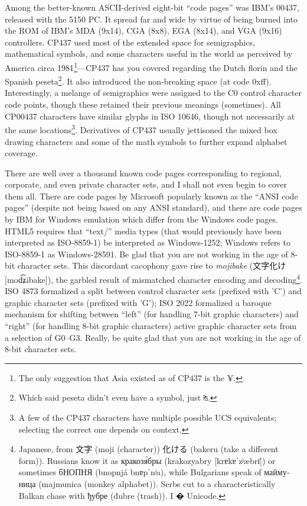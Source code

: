 Among the better-known ASCII-derived eight-bit ``code pages'' was IBM's 00437, released
with the 5150 PC. It spread far and wide by virtue of being burned into the
ROM of IBM's MDA (9x14), CGA (8x8), EGA (8x14), and VGA (9x16) controllers.
CP437 used most of the extended space for semigraphics, mathematical symbols,
and some characters useful in the world as perceived by America circa 1981\footnote{The
 only suggestion that Asia existed as of CP437 is the ¥.}---CP437 has you
covered regarding the Dutch florin and the Spanish peseta\footnote{Which said
peseta didn't even have a symbol, just \texttt{₧}.}. It also introduced
the non-breaking space (at code 0xff). Interestingly, a melange of semigraphics
were assigned to the C0 control character code points, though these retained
their previous meanings (sometimes). All CP00437 characters have similar
glyphs in ISO 10646, though not necessarily at the same locations\footnote{A few
of the CP437 characters have multiple possible UCS equivalents;
selecting the correct one depends on context.}. Derivatives of CP437
usually jettisoned the mixed box drawing characters and some of the math
symbols to further expand alphabet coverage.

There are well over a thousand known code pages corresponding to regional,
corporate, and even private character sets, and I shall not even begin to
cover them all. There are code pages by Microsoft popularly known as the ``ANSI
code pages'' (despite not being based on any ANSI standard), and there are code
pages by IBM for Windows emulation which differ from the Windows code pages.
HTML5 requires that ``text/'' media types (that would previously have been interpreted
as ISO-8859-1) be interpreted as Windows-1252; Windows refers to
ISO-8859-1 as Windows-28591. Be glad that you are not working in the age of
8-bit character sets. This discordant cacophony gave rise to \textit{mojibake}
(文字化け [{mod͡ʑibake}]), the garbled result of
mismatched character encoding and decoding\footnote{Japanese, from 文字 (moji
(character)) 化ける (bakeru (take a different form)). Russians know it as
\textrussian{кракозя́бры} (krakozyabry [{krɐkɐˈzʲæbrɪ̈}]) or sometimes \textrussian{бНОПНЯ} (bnopnjá
{bnɐpˈnʲa}), while Bulgarians speak of
\textbulgarian{маймуница} (majmunica (monkey alphabet)). Serbs cut to a
characteristically Balkan chase with \textrussian{ђубре} (đubre (trash)). I
{�} Unicode.}. ISO 4873\cite{iso4873} formalized a
split between control character sets (prefixed with 'C') and graphic character
sets (prefixed with 'G'); ISO 2022 formalized a baroque mechanism for shifting
between ``left'' (for handling 7-bit graphic characters) and ``right''
(for handling 8-bit graphic characters) active graphic character sets from a
selection of G0--G3. Really, be quite glad that you are not working in the age
of 8-bit character sets.

